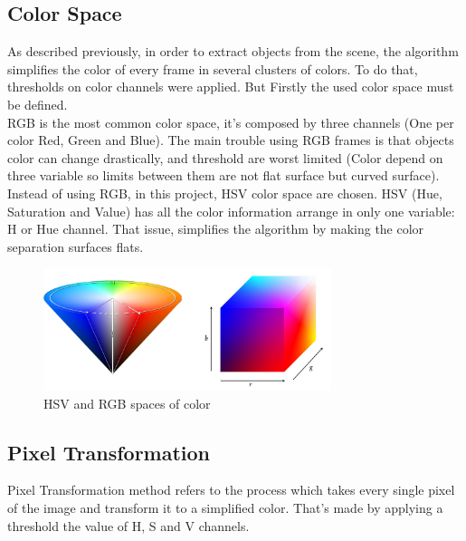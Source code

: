 \subsection{Color Space}
As described previously, in order to extract objects from the scene, the algorithm simplifies the color of every frame in several clusters of colors. To do that, thresholds on color channels were applied. But Firstly the used color space must be defined. \\
RGB is the most common color space, it's composed by three channels (One per color Red, Green and Blue). The main trouble using RGB frames is that objects color can change drastically, and threshold are worst limited (Color depend on three variable so limits between them are not flat surface but curved surface).
Instead of using RGB, in this project, HSV color space are chosen. HSV (Hue, Saturation and Value) has all the color information arrange in only one variable: H or Hue channel. That issue, simplifies the algorithm by making the color separation surfaces flats.  \\

\begin{figure}[h]
	\centering
	\includegraphics[width=0.75\textwidth,natwidth=944,natheight=400]{../Images/c2/HSV_vs_RGB.png}
	\caption{HSV and RGB spaces of color}
	\label{fig:HSV_vs_RGB}
\end{figure}

\subsection{Pixel Transformation}
Pixel Transformation method refers to the process which takes every single pixel of the image and transform it to a simplified color. That's made by applying a threshold the value of H, S and V channels. \\

